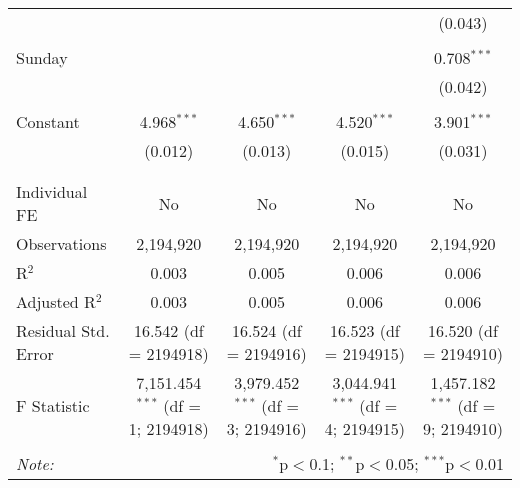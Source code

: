 \documentclass[
]{article}
\begin{document}
\begin{table}[!htbp]
{\begin{tabular}{@{\extracolsep{5pt}}lcccc}
  &  &  &  & (0.043) \\ 
  & & & & \\ 
 Sunday &  &  &  & 0.708$^{***}$ \\ 
  &  &  &  & (0.042) \\ 
  & & & & \\ 
 Constant & 4.968$^{***}$ & 4.650$^{***}$ & 4.520$^{***}$ & 3.901$^{***}$ \\ 
  & (0.012) & (0.013) & (0.015) & (0.031) \\ 
  & & & & \\ 
\hline \\[-1.8ex] 
Individual FE & No & No & No & No \\ 
Observations & 2,194,920 & 2,194,920 & 2,194,920 & 2,194,920 \\ 
R$^{2}$ & 0.003 & 0.005 & 0.006 & 0.006 \\ 
Adjusted R$^{2}$ & 0.003 & 0.005 & 0.006 & 0.006 \\ 
Residual Std. Error & 16.542 (df = 2194918) & 16.524 (df = 2194916) & 16.523 (df = 2194915) & 16.520 (df = 2194910) \\ 
F Statistic & 7,151.454$^{***}$ (df = 1; 2194918) & 3,979.452$^{***}$ (df = 3; 2194916) & 3,044.941$^{***}$ (df = 4; 2194915) & 1,457.182$^{***}$ (df = 9; 2194910) \\ 
\hline 
\hline \\[-1.8ex] 
\textit{Note:}  & \multicolumn{4}{r}{$^{*}$p$<$0.1; $^{**}$p$<$0.05; $^{***}$p$<$0.01} \\ 
\end{tabular}
} 
\end{table} 
\newpage
\end{document}
